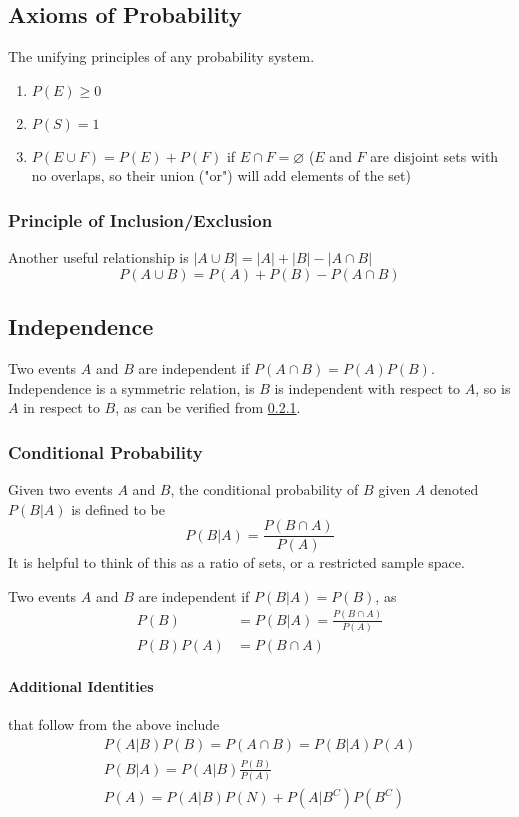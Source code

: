 \documentclass{article}
\begin{document}
\subsection{Axioms of Probability}\label{prob-ax}
The unifying principles of any probability system.

\begin{enumerate}
    \item $P(E)\ge0$
    \item $P(S)=1$
    \item $P(E \cup F) = P(E) + P(F)$ if $E \cap F = \varnothing$ ($E$ and $F$ are disjoint sets with no overlaps, so their union ("or") will add elements of the set)
\end{enumerate}

\subsubsection{Principle of Inclusion/Exclusion}
Another useful relationship is
$|A \cup B| = |A| + |B| - |A \cap B|$
$$P(A \cup B) = P(A) + P(B) - P(A \cap B)$$

\subsection{Independence}
Two events $A$ and $B$ are independent if $P(A \cap B) = P(A)P(B)$.
Independence is a symmetric relation, is $B$ is independent with respect to $A$, so is $A$ in respect to $B$, as can be verified from \ref{cond-prob}.

\subsubsection{Conditional Probability}\label{cond-prob}
Given two events $A$ and $B$, the conditional probability of $B$ given $A$ denoted $P(B|A)$ is defined to be 
$$P(B|A)=\frac{P(B \cap A)}{P(A)}$$
It is helpful to think of this as a ratio of sets, or a restricted sample space.

Two events $A$ and $B$ are independent if $P(B|A)=P(B)$, as
\begin{align*}
    P(B) &= P(B|A) = \frac{P(B \cap A)}{P(A)}\\
    P(B)P(A) &= P(B \cap A)
\end{align*}

\paragraph{Additional Identities} that follow from the above include
\begin{align*}
    P(A|B)P(B) = P(A \cap B) = P(B|A)P(A)\\
    P(B|A) = P(A|B)\frac{P(B)}{P(A)}\\
    P(A) = P(A|B)P(N)+P(A|B^C)P(B^C)
\end{align*}
\end{document}
